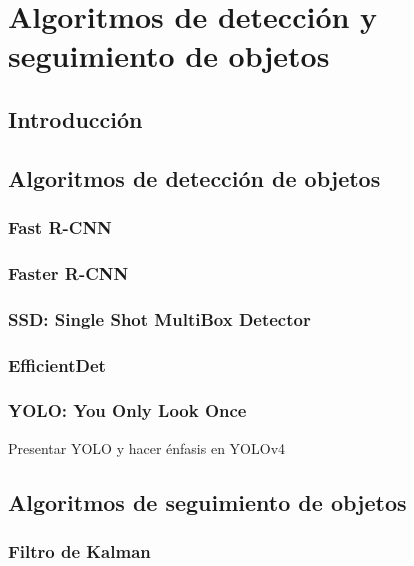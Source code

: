 
\chapter{Algoritmos de detección y seguimiento de objetos}
\label{cha:algorithms}

\section{Introducción}
\label{sec:intro-algorithms}

\section{Algoritmos de detección de objetos}
\label{sec:tecnicas-utilizadas-detection}

\subsection{Fast R-CNN}
\label{subsec:fast-rcnn}

\subsection{Faster R-CNN}
\label{subsec:faster-rcnn}

\subsection{SSD: Single Shot MultiBox Detector}
\label{subsec:ssd}

\subsection{EfficientDet}
\label{subsec:efficientdet}

\subsection{YOLO: You Only Look Once}
\label{subsec:yolo}

Presentar YOLO y hacer énfasis en YOLOv4

\section{Algoritmos de seguimiento de objetos}
\label{sec:tecnicas-utilizadas-tracking}

\subsection{Filtro de Kalman}
\label{subsec:kalman-filter}


